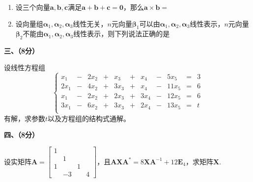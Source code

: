 \documentclass[11pt,a4paper]{ctexart}
\begin{document}
\begin{framed}
\begin{enumerate}
        \item 设三个向量\(\boldsymbol{a}, \boldsymbol{b} , \boldsymbol{c}\)满足\(\boldsymbol{a} + \boldsymbol{b} + \boldsymbol{c} = \boldsymbol{0}\)，那么\(\boldsymbol{a} \times \boldsymbol{b} = \)\kh{}

        \item 设向量组\(\boldsymbol{\alpha}_1, \boldsymbol{\alpha}_2 , \boldsymbol{\alpha}_3\)线性无关，\(n\)元向量\(\boldsymbol{\beta}_1\)可以由\(\boldsymbol{\alpha}_1, \boldsymbol{\alpha}_2 ,\boldsymbol{\alpha}_3\)线性表示，\(n\)元向量\(\boldsymbol{\beta}_2\)不能由\(\boldsymbol{\alpha}_1, \boldsymbol{\alpha}_2 ,\boldsymbol{\alpha}_3\)线性表示，则下列说法正确的是\kh{}

	\end{enumerate}

	   


	\begin{large}
		\noindent\textbf{三、（8分）}
	\end{large}

    设线性方程组\[\left\{\begin{aligned}
        x_1&  -&2x_2 &+ & x_3& +& x_4&- & 5  x_5 & = & 3\\
        2x_1&  -&4x_2 &+ &3 x_3&+ & x_4&- &11  x_5 & = & 6\\
        x_1&  -&2x_2 &+ &2 x_3&  +&3x_4& -&12 x_5 & = & 6\\
        3x_1&  -&6x_2 &+ &3 x_3&  +&2x_4&  -&13x_5 & = & t\\
    \end{aligned}\right.\]有解，求参数\(t\)以及方程组的结构式通解。\[\] \[\]\[\]\[\]\[\]\[\]\[\]\[\]\[\]\[\]

    \begin{large}
        \noindent\textbf{四、（8分）}
    \end{large}
    设实矩阵\(\boldsymbol{A} = \displaystyle \begin{bmatrix}
        1 & & & \\ & 1 & & \\ 1 &  & 1 & \\ & -3 & & 4
    \end{bmatrix}\)，且\(\boldsymbol{AXA}^* = 8\boldsymbol{XA}^{-1} + 12 \boldsymbol{E}_4\)，求矩阵\(\boldsymbol{X}\).\[\] \[\]\[\]\[\]\[\]\[\]\[\]\[\]\[\]\[\]


\end{framed}
\end{document}
